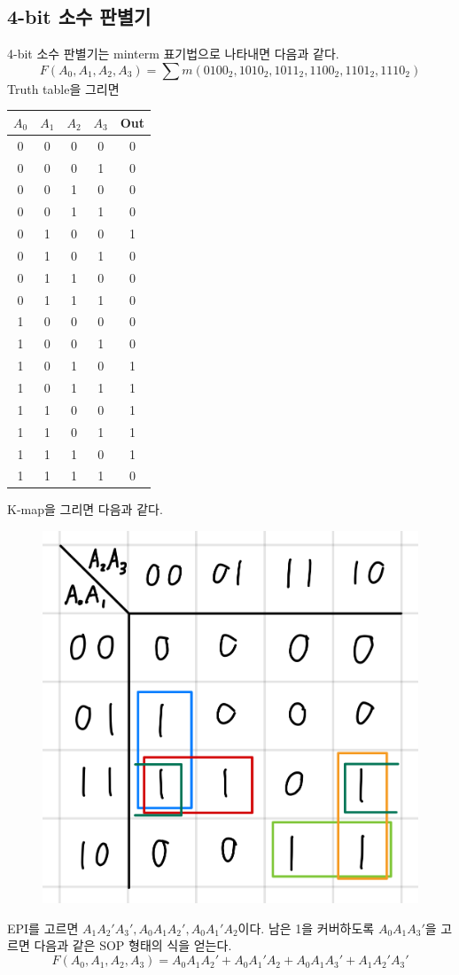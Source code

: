 \documentclass{scrartcl}
\begin{document}
\subsection{4-bit 소수 판별기}
4-bit 소수 판별기는 minterm 표기법으로 나타내면 다음과 같다.
\[
  F(A_0, A_1, A_2, A_3) = \sum m(0100_2, 1010_2, 1011_2, 1100_2, 1101_2, 1110_2)
\]
Truth table을 그리면
\begin{table}[H]
  \centering
  \begin{tabular}{|cccc|c|}
    \hline
    \(A_0\) & \(A_1\) & \(A_2\) & \(A_3\) & Out \\
    \hline
    0       & 0       & 0       & 0       & 0   \\
    0       & 0       & 0       & 1       & 0   \\
    0       & 0       & 1       & 0       & 0   \\
    0       & 0       & 1       & 1       & 0   \\
    0       & 1       & 0       & 0       & 1   \\
    0       & 1       & 0       & 1       & 0   \\
    0       & 1       & 1       & 0       & 0   \\
    0       & 1       & 1       & 1       & 0   \\
    1       & 0       & 0       & 0       & 0   \\
    1       & 0       & 0       & 1       & 0   \\
    1       & 0       & 1       & 0       & 1   \\
    1       & 0       & 1       & 1       & 1   \\
    1       & 1       & 0       & 0       & 1   \\
    1       & 1       & 0       & 1       & 1   \\
    1       & 1       & 1       & 0       & 1   \\
    1       & 1       & 1       & 1       & 0   \\
    \hline
  \end{tabular}
\end{table}
K-map을 그리면 다음과 같다.
\begin{figure}[H]
  \centering
  \includegraphics[width=0.3\linewidth]{lab3_2_km}
\end{figure}
EPI를 고르면 \(A_1 A_2' A_3', A_0 A_1 A_2', A_0 A_1' A_2\)이다.
남은 1을 커버하도록 \(A_0 A_1 A_3'\)을 고르면 다음과 같은 SOP 형태의 식을 얻는다.
\[
  F(A_0, A_1, A_2, A_3) = A_0 A_1 A_2' + A_0 A_1' A_2 + A_0 A_1 A_3' + A_1 A_2' A_3'
\]
\end{document}

